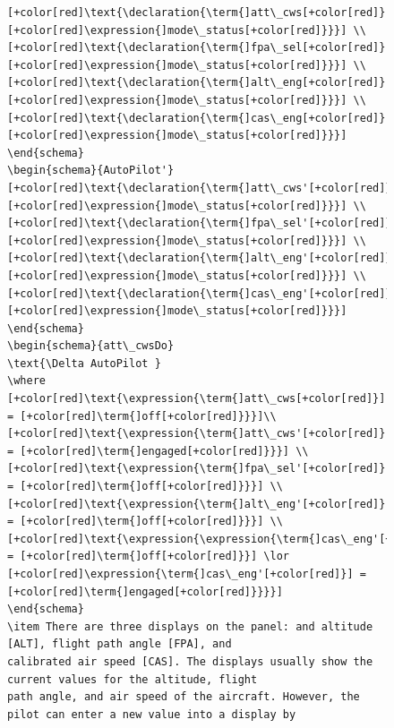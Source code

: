 \begin{figure}[H]
\begin{minipage}{0.45\textwidth}
\begin{tiny}
\begin{BVerbatim}[commandchars=+\[\]]
[+color[red]\text{\declaration{\term{]att\_cws[+color[red]}]: [+color[red]\expression{]mode\_status[+color[red]}}}] \\
[+color[red]\text{\declaration{\term{]fpa\_sel[+color[red]}]: [+color[red]\expression{]mode\_status[+color[red]}}}] \\
[+color[red]\text{\declaration{\term{]alt\_eng[+color[red]}]: [+color[red]\expression{]mode\_status[+color[red]}}}] \\
[+color[red]\text{\declaration{\term{]cas\_eng[+color[red]}]: [+color[red]\expression{]mode\_status[+color[red]}}}] 
\end{schema}  
\begin{schema}{AutoPilot'}
[+color[red]\text{\declaration{\term{]att\_cws'[+color[red]}]: [+color[red]\expression{]mode\_status[+color[red]}}}] \\
[+color[red]\text{\declaration{\term{]fpa\_sel'[+color[red]}]: [+color[red]\expression{]mode\_status[+color[red]}}}] \\
[+color[red]\text{\declaration{\term{]alt\_eng'[+color[red]}]: [+color[red]\expression{]mode\_status[+color[red]}}}] \\
[+color[red]\text{\declaration{\term{]cas\_eng'[+color[red]}]: [+color[red]\expression{]mode\_status[+color[red]}}}] 
\end{schema}
\begin{schema}{att\_cwsDo}
\text{\Delta AutoPilot }
\where
[+color[red]\text{\expression{\term{]att\_cws[+color[red]}] = [+color[red]\term{]off[+color[red]}}}]\\
[+color[red]\text{\expression{\term{]att\_cws'[+color[red]}] = [+color[red]\term{]engaged[+color[red]}}}] \\
[+color[red]\text{\expression{\term{]fpa\_sel'[+color[red]}] = [+color[red]\term{]off[+color[red]}}}] \\
[+color[red]\text{\expression{\term{]alt\_eng'[+color[red]}] = [+color[red]\term{]off[+color[red]}}}] \\
[+color[red]\text{\expression{\expression{\term{]cas\_eng'[+color[red]}] = [+color[red]\term{]off[+color[red]}}] \lor
[+color[red]\expression{\term{]cas\_eng'[+color[red]}] = [+color[red]\term{]engaged[+color[red]}}}}]
\end{schema}      
\item There are three displays on the panel: and altitude [ALT], flight path angle [FPA], and
calibrated air speed [CAS]. The displays usually show the current values for the altitude, flight
path angle, and air speed of the aircraft. However, the pilot can enter a new value into a display by

\end{BVerbatim}
\end{tiny}
\end{minipage}
\end{figure}
